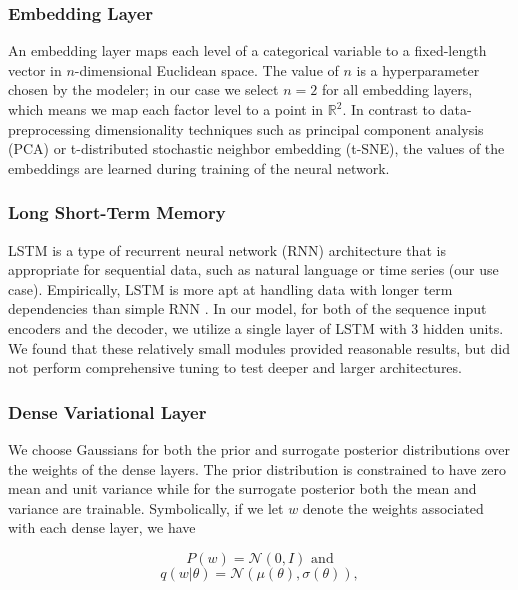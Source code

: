 \documentclass{article}
\begin{document}
\subsubsection{Embedding Layer}

An embedding layer maps each level of a categorical variable to a fixed-length 
vector in $n$-dimensional Euclidean space. The value of $n$ is a hyperparameter 
chosen by the modeler; in our case we select $n = 2$ for all embedding layers, 
which means we map each factor level to a point in $\mathbb{R}^2$. In contrast 
to data-preprocessing dimensionality techniques such as principal component 
analysis (PCA) or t-distributed stochastic neighbor embedding (t-SNE), the 
values of the embeddings are learned during training of the neural network.

\subsubsection{Long Short-Term Memory}

LSTM is a type of recurrent neural network (RNN) architecture that is 
appropriate for sequential data, such as natural language or time series (our 
use case). Empirically, LSTM is more apt at handling data with longer term 
dependencies than simple RNN \cite{lecunDeepLearning2015}. In our model, for 
both of the sequence input encoders and the decoder, we utilize a single layer 
of LSTM with 3 hidden units. We found that these relatively small modules 
provided reasonable results, but did not perform comprehensive tuning to test
deeper and larger architectures. 

\subsubsection{Dense Variational Layer}

We choose Gaussians for both the prior and surrogate posterior distributions 
over the weights of the dense layers. The prior distribution is constrained to 
have zero mean and unit variance while for the surrogate posterior both the mean and
variance are trainable. Symbolically, if we let $w$ denote the weights 
associated with each dense layer, we have

\begin{equation}
    P(w) = \mathcal{N}(0, I) \text{ and}
\end{equation}
\begin{equation}
    q(w|\theta) = \mathcal{N}(\mu(\theta), \sigma(\theta)),
\end{equation}
\end{document}
